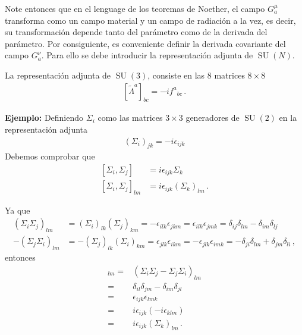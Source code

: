\begin{frame}

Note entonces que en el lenguage de los teoremas de Noether, el campo $G^{\mu}_{a}$ transforma como un campo material y un campo de radiación a la vez, es decir, su transformación depende tanto del parámetro como de la derivada del parámetro. Por consiguiente, es conveniente definir la derivada covariante del campo $G^{\nu}_{a}$. Para ello se debe introducir la representación adjunta de $\operatorname{SU}(N)$.


La representación adjunta de $\operatorname{SU}(3)$, consiste en las 8 matrices $8\times 8$
\begin{align}
  \left[  \widetilde{\Lambda}^{a}\right]_{bc}=-i {f^{a}}_{bc}\,.
\end{align}


\noindent
\textbf{Ejemplo:} Definiendo $\Sigma_i$ como las matrices $3\times3$ generadores de $\operatorname{SU}(2)$ en la representaci\'on adjunta
\begin{align}
  (\Sigma_i)_{jk}=-i\epsilon_{ijk}
\end{align}
Debemos comprobar que
\begin{align}
  \left[{\Sigma_i},{\Sigma_j}\right]&=i\epsilon_{ijk}{\Sigma_k}\nonumber\\
  \left[{\Sigma_i},{\Sigma_j}\right]_{lm}&=i\epsilon_{ijk}(\Sigma_k)_{lm}\,.
\end{align}

Ya que
\begin{align}
  \label{eq:167}
  (\Sigma_i\Sigma_j)_{lm}&=(\Sigma_i)_{lk}(\Sigma_j)_{km}=-\epsilon_{ilk}\epsilon_{jkm}=\epsilon_{ilk}\epsilon_{jmk}=\delta_{ij}\delta_{lm}-\delta_{im}\delta_{lj}\nonumber\\
  -(\Sigma_j\Sigma_i)_{lm}&=-(\Sigma_j)_{lk}(\Sigma_i)_{km}=\epsilon_{jlk}\epsilon_{ikm}=-\epsilon_{jlk}\epsilon_{imk}=-\delta_{ji}\delta_{lm}+\delta_{jm}\delta_{li}\,,
\end{align}
entonces
\begin{align}
[\Sigma_i,\Sigma_j]_{lm}=& (\Sigma_i\Sigma_j-\Sigma_j\Sigma_i)_{lm}\nonumber\\
=&\delta_{il}\delta_{jm}-\delta_{im}\delta_{jl}\nonumber\\
=&\epsilon_{ijk}\epsilon_{lmk}\nonumber\\
=&i\epsilon_{ijk}(-i\epsilon_{klm})\nonumber\\
=&i\epsilon_{ijk}(\Sigma_k)_{lm}\,.
\end{align}


\end{frame}
